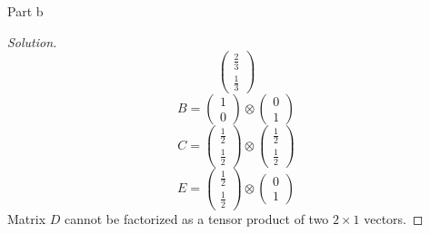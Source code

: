 \begin{solution}{Part b}
\begin{proof}[Solution]
\begin{equation}
\begin{pmatrix}
            \frac{2}{3}\\[0.1em]
            \frac{1}{3}
          \end{pmatrix}
    \end{equation}
    \begin{equation}
      B = \begin{pmatrix}
            1\\
            0
          \end{pmatrix}
          \otimes
          \begin{pmatrix}
            0\\
            1
          \end{pmatrix}
    \end{equation}
    \begin{equation}
      C = \begin{pmatrix}
            \frac{1}{2}\\[0.1em]
            \frac{1}{2}
          \end{pmatrix}
          \otimes
          \begin{pmatrix}
            \frac{1}{2}\\[0.1em]
            \frac{1}{2}
          \end{pmatrix}
    \end{equation}
    \begin{equation}
      E = \begin{pmatrix}
            \frac{1}{2}\\[0.1em]
            \frac{1}{2}
          \end{pmatrix}
          \otimes
          \begin{pmatrix}
            0\\
            1
          \end{pmatrix}
    \end{equation}
    Matrix $D$ cannot be factorized as a tensor product of two $2 \times 1$ vectors.
  \end{proof}
\end{solution}

